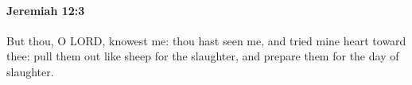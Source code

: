 
		\paragraph{Jeremiah 12:3} %
			\label{JEREMIAH-12-3}

			But thou, O LORD, knowest me: thou hast seen me, and tried mine heart toward thee: pull them out like sheep for the slaughter, and prepare them for the day of slaughter.


